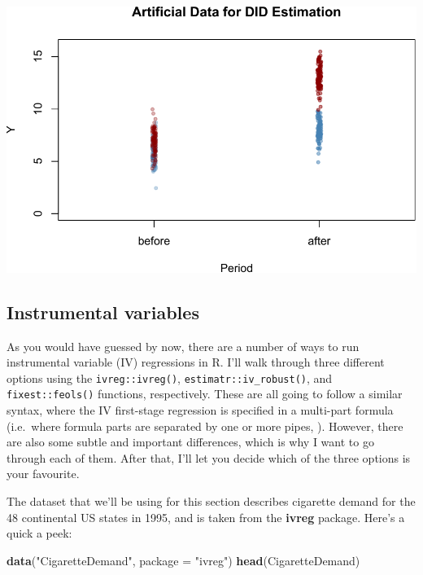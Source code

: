 \documentclass[
]{article}
\newenvironment{Shaded}{\begin{snugshade}}{\end{snugshade}}
\newcommand{\AttributeTok}[1]{\textcolor[rgb]{0.13,0.29,0.53}{#1}}
\newcommand{\FunctionTok}[1]{\textcolor[rgb]{0.13,0.29,0.53}{\textbf{#1}}}
\newcommand{\NormalTok}[1]{#1}
\newcommand{\StringTok}[1]{\textcolor[rgb]{0.31,0.60,0.02}{#1}}
\begin{document}
\includegraphics{11-panel-twfe_files/figure-latex/did-data-1.pdf}

\hypertarget{instrumental-variables}{%
\subsection{Instrumental variables}\label{instrumental-variables}}

As you would have guessed by now, there are a number of ways to run
instrumental variable (IV) regressions in R. I'll walk through three
different options using the \texttt{ivreg::ivreg()},
\texttt{estimatr::iv\_robust()}, and \texttt{fixest::feols()} functions,
respectively. These are all going to follow a similar syntax, where the
IV first-stage regression is specified in a multi-part formula
(i.e.~where formula parts are separated by one or more pipes,
\textbf{\texttt{\textbar{}}}). However, there are also some subtle and
important differences, which is why I want to go through each of them.
After that, I'll let you decide which of the three options is your
favourite.

The dataset that we'll be using for this section describes cigarette
demand for the 48 continental US states in 1995, and is taken from the
\textbf{ivreg} package. Here's a quick a peek:

\begin{Shaded}
\begin{Highlighting}[]
\FunctionTok{data}\NormalTok{(}\StringTok{"CigaretteDemand"}\NormalTok{, }\AttributeTok{package =} \StringTok{"ivreg"}\NormalTok{)}
\FunctionTok{head}\NormalTok{(CigaretteDemand)}
\end{Highlighting}
\end{Shaded}
\end{document}
